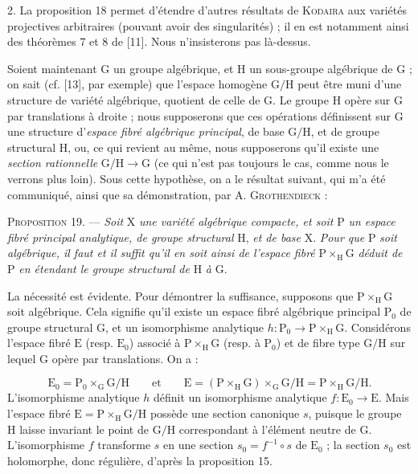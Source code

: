 2. La proposition 18 permet d'étendre d'autres résultats de \textsc{Kodaira} aux variétés projectives arbitraires (pouvant avoir des singularités) ; il en est notamment ainsi des théorèmes 7 et 8 de [11]. Nous n'insisterons pas là-dessus.

Soient maintenant $\mathrm{G}$ un groupe algébrique, et $\mathrm{H}$ un sous-groupe algébrique de $\mathrm{G}$ ; on sait (cf. [13], par exemple) que l'espace homogène $\mathrm{G}/\mathrm{H}$ peut être muni d'une structure de variété algébrique, quotient de celle de $\mathrm{G}$. Le groupe $\mathrm{H}$ opère sur $\mathrm{G}$ par translations à droite ; nous supposerons que ces opérations définissent sur $\mathrm{G}$ une structure d'\textit{espace fibré algébrique principal}, de base $\mathrm{G}/\mathrm{H}$, et de groupe structural $\mathrm{H}$, ou, ce qui revient au même, nous supposerons qu'il existe une \textit{section rationnelle} $\mathrm{G}/\mathrm{H} \to \mathrm{G}$ (ce qui n'est pas toujours le cas, comme nous le verrons plus loin). Sous cette hypothèse, on a le résultat suivant, qui m'a été communiqué, ainsi que sa démonstration, par A. \textsc{Grothendieck} :

\textsc{Proposition} 19. --- \textit{Soit} $\mathrm{X}$ \textit{une variété algébrique compacte, et soit} $\mathrm{P}$ \textit{un espace fibré principal analytique, de groupe structural} $\mathrm{H}$, \textit{et de base} $\mathrm{X}$. \textit{Pour que} $\mathrm{P}$ \textit{soit algébrique, il faut et il suffit qu'il en soit ainsi de l'espace fibré} $\mathrm{P} \times_{\mathrm{H}} \mathrm{G}$ \textit{déduit de} $\mathrm{P}$ \textit{en étendant le groupe structural de} $\mathrm{H}$ \textit{à} $\mathrm{G}$.



La nécessité est évidente. Pour démontrer la suffisance, supposons que $\mathrm{P} \times_{\mathrm{H}} \mathrm{G}$ soit algébrique. Cela signifie qu'il existe un espace fibré algébrique principal $\mathrm{P}_0$ de groupe structural $\mathrm{G}$, et un isomorphisme analytique $h : \mathrm{P}_0 \to \mathrm{P} \times_{\mathrm{H}} \mathrm{G}$. Considérons l'espace fibré $\mathrm{E}$ (resp. $\mathrm{E}_0$) associé à $\mathrm{P} \times_{\mathrm{H}} \mathrm{G}$ (resp. à $\mathrm{P}_0$) et de fibre type $\mathrm{G}/\mathrm{H}$ sur lequel $\mathrm{G}$ opère par translations. On a :

\begin{equation*}
\mathrm{E}_0 = \mathrm{P}_0 \times_{\mathrm{G}} \mathrm{G}/\mathrm{H} \qquad \mathrm{et} \qquad \mathrm{E} = (\mathrm{P} \times_{\mathrm{H}} \mathrm{G}) \times_{\mathrm{G}} \mathrm{G}/\mathrm{H} = \mathrm{P} \times_{\mathrm{H}} \mathrm{G}/\mathrm{H}.
\end{equation*}
L'isomorphisme analytique $h$ définit un isomorphisme analytique $f : \mathrm{E}_0 \to \mathrm{E}$. Mais l'espace fibré $\mathrm{E} = \mathrm{P} \times_{\mathrm{H}} \mathrm{G}/\mathrm{H}$ possède une section canonique $s$, puisque le groupe $\mathrm{H}$ laisse invariant le point de $\mathrm{G}/\mathrm{H}$ correspondant à l'élément neutre de $\mathrm{G}$. L'isomorphisme $f$ transforme $s$ en une section $s_0 = f^{-1} \circ s$ de $\mathrm{E}_0$ ; la section $s_0$ est holomorphe, donc régulière, d'après la proposition 15.

